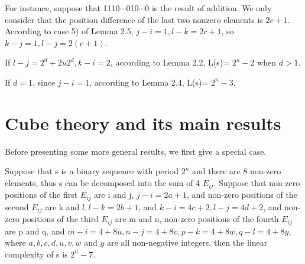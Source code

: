 \documentclass[10pt,conference,twocolumn]{IEEEtran}
\begin{document}
For instance, suppose that 1110$\cdots$010$\cdots$0 is the result of
addition. We only consider that the position difference of the last
two nonzero elements is $2c+1$. According to case 5) of Lemma 2.5,
$j-i=1,l-k=2c+1$, so $k-j=1, l-j=2(c+1)$.

If $l-j=2^d+2u2^d, k-i=2$, according to Lemma 2.2, L(s)= $2^n-2$
when $d>1$.

 If $d=1$, since $j-i=1$, according to Lemma 2.4, L(s)= $2^n-3$.


\section{Cube theory and its main results}

Before presenting some more general results, we first give a special
case.

 Suppose that s is a binary sequence with
period $2^n$ and there are 8 non-zero elements, thus s can be
decomposed into the sum of 4 $E_{ij}$. Suppose that non-zero
positions of the first $E_{ij}$ are i and j, $j-i=2a+1$, and
non-zero positions of the second $E_{ij}$ are k and $l, l-k=2b+1$,
and $k-i=4c+2, l-j=4d+2$, and non-zero positions of the third
$E_{ij}$ are m and n, non-zero positions of the fourth $E_{ij}$ are
p and q, and $m-i=4+8u, n-j=4+8v, p-k=4+8w, q-l=4+8y$, where
$a,b,c,d,u,v,w$ and $y$ are all non-negative integers, then the
linear complexity of s is $2^n-7$.
\end{document}
